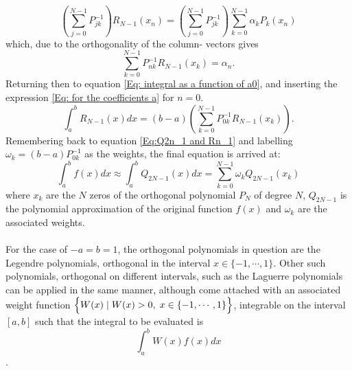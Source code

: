 \documentclass[10pt,a4paper]{article}
\begin{document}
\begin{equation*}
\left( \sum\limits_{j=0}^{N-1}P_{jk}^{-1} \right)R_{N-1}(x_n) = \left( \sum\limits_{j=0}^{N-1}P_{jk}^{-1} \right)\sum\limits_{k=0}^{N-1} \alpha_k P_k(x_n)
\end{equation*}
which, due to the orthogonality of the column- vectors gives
\begin{equation}\label{Eq: for the coefficients a}
\sum\limits_{k=0}^{N-1}P_{nk}^{-1}R_{N-1}(x_k) = \alpha_n.
\end{equation}
Returning then to equation \ref{Eq: integral as a function of a0}, and inserting the expression \ref{Eq: for the coefficients a} for $n=0$.
\begin{equation}
\int_{a}^bR_{N-1}(x)dx = (b-a)\left( \sum\limits_{k=0}^{N-1}P_{0k}^{-1} R_{N-1}(x_k)\right).
\end{equation}
Remembering back to equation \ref{Eq:Q2n_1 and Rn_1} and labelling $\omega_k =(b-a)P_{0k}^{-1}$ as the weights, the final equation is arrived at:
\begin{equation}
\int_{a}^bf(x)dx \approx \int_{a}^bQ_{2N-1}(x)dx=\sum\limits_{k=0}^{N-1}\omega_k Q_{2N-1}(x_k)
\end{equation}
where $x_k$ are the $N$ zeros of the orthogonal polynomial $P_N$ of degree $N$, $Q_{2N-1}$ is the polynomial approximation of the original function $f(x)$ and $\omega_k$ are the associated weights.\\\\For the case of $-a=b=1$, the orthogonal polynomials in question are the Legendre polynomials, orthogonal in the interval $x\in \{-1,\cdots,1\}$. Other such polynomials, orthogonal on different intervals, such as the Laguerre polynomials can be applied in the same manner, although come attached with an associated weight function $\Big \{W(x)\hspace{1mm}|\hspace{1mm} W(x)>0,\hspace{1mm}x \in \{-1,\cdots,1\}\Big \}$, integrable on the interval $[a,b]$ such that the integral to be evaluated is 
$$
\int_a^b W(x)f(x)dx
$$\cite{Lecture_Notes_Fall_2015}.
\end{document}
